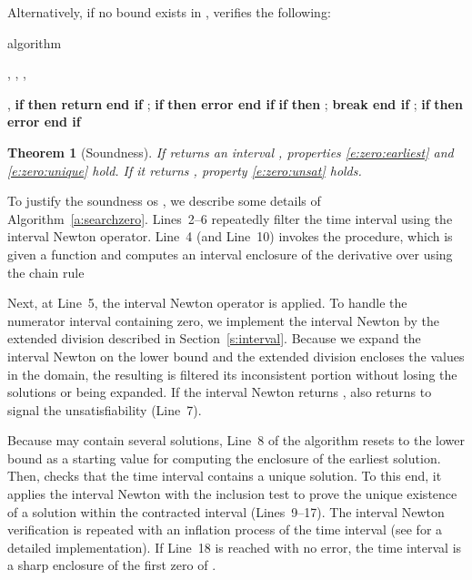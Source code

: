 \documentclass[paper]{ieice}
\newtheorem{theorem}{Theorem}
\begin{document}
Alternatively, if no bound exists in ,  verifies the following:


\begin{algorithm}[t]
\caption{\label{a:searchzero}  algorithm}

\begin{algorithmic}[1]
  \REQUIRE , 
     , 
, 
	 
	 \ENSURE  \PARAM , \STATE  {}
    \STATE 
\STATE 
	\STATE 
\UNTIL{}
  \STATE \textbf{if}  \textbf{then return}  \textbf{end if}
\vspace{.5em}
  \STATE ; \quad 
	\STATE 
    \STATE \textbf{if}  \textbf{then error end if}
    \STATE 
	\STATE \textbf{if} 
	  \textbf{then} ; \textbf{break end if}
\STATE ; \quad 
	\STATE 
	\STATE \textbf{if}  \textbf{then error end if}
  \ENDLOOP
\vspace{.5em}
\RETURN 
\end{algorithmic}
\end{algorithm}

\begin{theorem}[Soundness]
	If  returns an interval , properties \eqref{e:zero:earliest} and \eqref{e:zero:unique} hold.
	If it returns , property \eqref{e:zero:unsat} holds.
\end{theorem}

To justify the soundness os , we describe some details of Algorithm~\ref{a:searchzero}. 
Lines~2--6 repeatedly filter the time interval  using the interval Newton operator.
Line~4 (and Line~10) invokes the  procedure, which is given a function  and computes an interval enclosure of the derivative  over  using the chain rule

Next, at Line~5, the interval Newton operator is applied.
To handle the numerator interval  containing zero, we implement the interval Newton by the extended division described in Section~\ref{s:interval}.
Because we expand the interval Newton on the lower bound  and the extended division encloses the values in the  domain, the resulting  is filtered its inconsistent portion without losing the solutions or being expanded.
If the interval Newton returns ,  also returns  to signal the unsatisfiability (Line~7).

Because  may contain several solutions, 
Line~8 of the algorithm resets  to the lower bound as a starting value for computing the enclosure of the earliest solution.
Then,  checks that the time interval contains a unique solution.
To this end, it applies the interval Newton with the inclusion test to prove the unique existence of a solution within the contracted interval  (Lines~9--17).
The interval Newton verification is repeated with an inflation process of the time interval (see \cite{Goldztejn2010:RC} for a detailed implementation).
If Line~18 is reached with no error, the time interval  is a sharp enclosure of the first zero of . 
\end{document}
